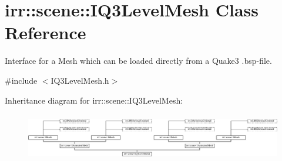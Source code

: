 \hypertarget{classirr_1_1scene_1_1IQ3LevelMesh}{}\section{irr\+:\+:scene\+:\+:I\+Q3\+Level\+Mesh Class Reference}
\label{classirr_1_1scene_1_1IQ3LevelMesh}


Interface for a Mesh which can be loaded directly from a Quake3 .bsp-\/file.  




{\ttfamily \#include $<$I\+Q3\+Level\+Mesh.\+h$>$}

Inheritance diagram for irr\+:\+:scene\+:\+:I\+Q3\+Level\+Mesh\+:\begin{figure}[H]
\begin{center}
\leavevmode
\includegraphics[height=2.121212cm]{classirr_1_1scene_1_1IQ3LevelMesh}
\end{center}
\end{figure}
